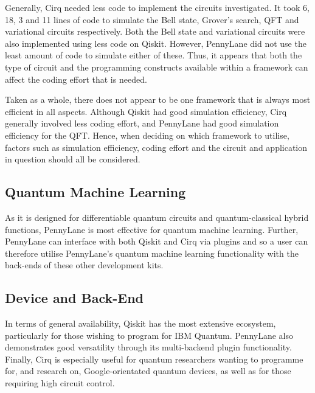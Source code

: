 \documentclass[journal]{IEEEtran}
\begin{document}
Generally, Cirq needed less code to implement the circuits investigated. It took 6, 18, 3 and 11 lines of code to simulate the Bell state, Grover's search, QFT and variational circuits respectively. Both the Bell state and variational circuits were also implemented using less code on Qiskit. However, PennyLane did not use the least amount of code to simulate either of these. Thus, it appears that both the type of circuit and the programming constructs available within a framework can affect the coding effort that is needed.

Taken as a whole, there does not appear to be one framework that is always most efficient in all aspects. Although Qiskit had good simulation efficiency, Cirq generally involved less coding effort, and PennyLane had good simulation efficiency for the QFT. Hence, when deciding on which framework to utilise, factors such as simulation efficiency, coding effort and the circuit and application in question should all be considered.

\subsection{Quantum Machine Learning}
As it is designed for differentiable quantum circuits and quantum-classical hybrid functions, PennyLane is most effective for quantum machine learning. Further, PennyLane can interface with both Qiskit and Cirq via plugins and so a user can therefore utilise PennyLane's quantum machine learning functionality with the back-ends of these other development kits.

\subsection{Device and Back-End}
In terms of general availability, Qiskit has the most extensive ecosystem, particularly for those wishing to program for IBM Quantum. PennyLane also demonstrates good versatility through its multi-backend plugin functionality. Finally, Cirq is especially useful for quantum researchers wanting to programme for, and research on, Google-orientated quantum devices, as well as for those requiring high circuit control.
\end{document}

